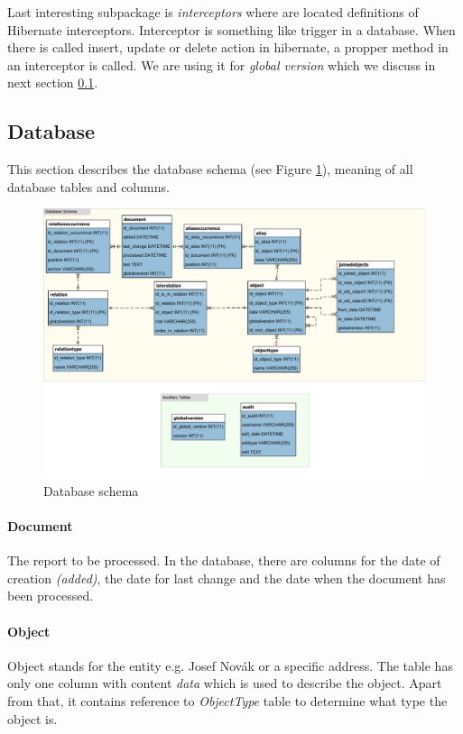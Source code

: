 Last interesting subpackage is \emph{interceptors} where are located definitions
of Hibernate interceptors. Interceptor is something like trigger in a database.
When there is called insert, update or delete action in hibernate, a propper method
in an interceptor is called. We are using it for \emph{global version} which we
discuss in next section \ref{sec:Database}.

\subsection{Database}
\label{sec:Database}

This section describes the database schema (see Figure \ref{fig:DatabaseSchema}), meaning of all database tables and columns.

\begin{figure}[!htb]
        \centering
        \includegraphics[width=\textwidth]{Images/DatabaseSchema}
        \caption{Database schema}
        \label{fig:DatabaseSchema}
\end{figure}

\paragraph{Document} The report to be processed. In the database, there are columns for the date of 
creation \emph{(added)}, the date for last change and the date when the document has been processed.

\paragraph{Object} Object stands for the entity e.g. Josef Novák or a specific address. 
The table has only one column with content \emph{data} which is used to describe the object. 
Apart from that, it contains reference to \emph{ObjectType} table to determine what type the object is.

